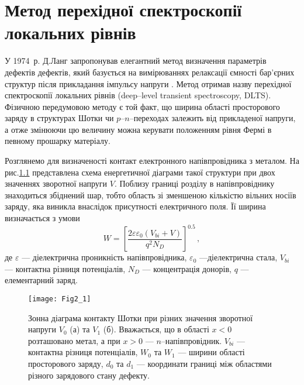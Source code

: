 \chapter{Метод перехідної спектроскопії \\ локальних рівнів}\label{chapDLTS}

У 1974~р. Д.Ланг запропонував елегантний метод визначення параметрів дефектів дефектів,
який базується на вимірюваннях релаксації ємності бар'єрних структур після прикладання
імпульсу напруги \cite{Lang} .
Метод отримав назву перехідної спектроскопії локальних рівнів (deep--level transient spectroscopy, DLTS).
Фізичною передумовою методу є той факт, що ширина області просторового заряду в структурах Шотки чи $p$--$n$--переходах
залежить від прикладеної напруги, а отже змінюючи цю величину можна керувати положенням рівня Фермі в певному
прошарку матеріалу.

Розглянемо для визначеності контакт електронного напівпровідника з металом.
На рис.\ref{F21} представлена схема енергетичної діаграми такої структури при двох значеннях зворотної напруги $V$.
Поблизу границі розділу в напівпровіднику знаходиться  збіднений шар,
тобто область зі зменшеною кількістю вільних носіїв заряду, яка виникла
внаслідок присутності електричного поля.
Її ширина визначається з умови
\begin{equation}
W=\left[\frac{2\varepsilon\varepsilon_0(V_{bi}+V)}{q^2N_D}\right]^{0.5}\,,
\end{equation}
де
$\varepsilon$ --- діелектрична проникність напівпровідника,
$\varepsilon_0$ ---діелектрична стала,
$V_{bi}$ --- контактна різниця потенціалів,
$N_D$ --- концентрація донорів,
$q$ --- елементарний заряд.

\begin{figure}[t]
\center
\vspace{-5mm}
\texttt{[image: Fig2\_1]}
\vspace{-3mm}
\caption{Зонна діаграма контакту Шотки при
різних значення зворотної напруги $V_0$ (а) та $V_1$ (б).
Вважається, що в області $x<0$ розташовано метал,
а при  $x>0$ --- $n$--напівпровідник.
$V_{bi}$ --- контактна різниця потенціалів,
$W_0$ та $W_1$ --- ширини області просторового заряду,
$d_0$ та $d_1$ --- координати границі між областями різного зарядового
стану дефекту.
}
\vspace{-3mm}
\label{F21}
\end{figure}

